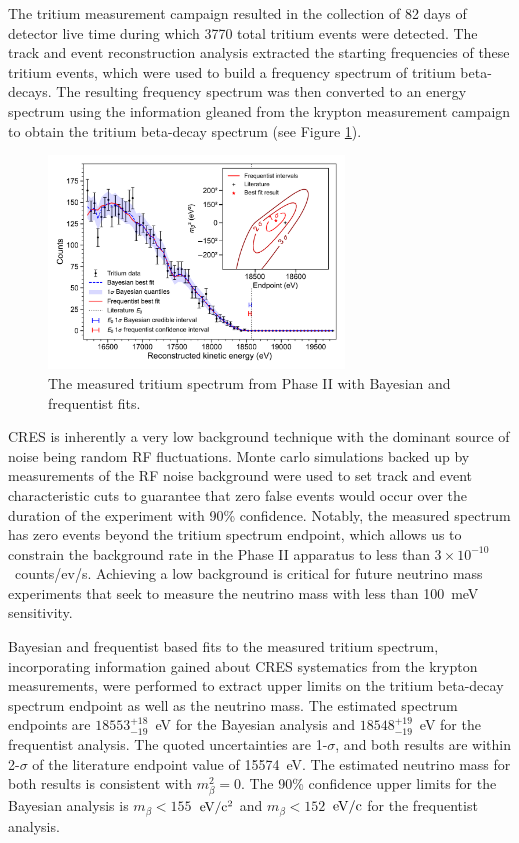 The tritium measurement campaign resulted in the collection of 82 days of detector live time during which 3770 total tritium events were detected. The track and event reconstruction analysis extracted the starting frequencies of these tritium events, which were used to build a frequency spectrum of tritium beta-decays. The resulting frequency spectrum was then converted to an energy spectrum using the information gleaned from the krypton measurement campaign to obtain the tritium beta-decay spectrum (see Figure \ref{fig:chap3-final-tritium-fit}).
\begin{figure}
    \centering
    \includegraphics[width=0.7\textwidth]{figs/Chapter-3/12-03-22A_final_E0_real_data_phase_II_tritium_fit_1d.pdf}
    \caption{The measured tritium spectrum from Phase II with Bayesian and frequentist fits.}
    \label{fig:chap3-final-tritium-fit}
\end{figure}

CRES is inherently a very low background technique with the dominant source of noise being random RF fluctuations. Monte carlo simulations backed up by measurements of the RF noise background were used to set track and event characteristic cuts to guarantee that zero false events would occur over the duration of the experiment with 90\% confidence. Notably, the measured spectrum has zero events beyond the tritium spectrum endpoint, which allows us to constrain the background rate in the Phase II apparatus to less than $3\times10^{-10}$~counts/ev/s. Achieving a low background is critical for future neutrino mass experiments that seek to measure the neutrino mass with less than 100~meV sensitivity.

Bayesian and frequentist based fits to the measured tritium spectrum, incorporating information gained about CRES systematics from the krypton measurements, were performed to extract upper limits on the tritium beta-decay spectrum endpoint as well as the neutrino mass. The estimated spectrum endpoints are $18553^{+18}_{-19}$~eV for the Bayesian analysis and $18548^{+19}_{-19}$~eV for the frequentist analysis. The quoted uncertainties are 1-$\sigma$, and both results are within 2-$\sigma$ of the literature endpoint value of 15574~eV. The estimated neutrino mass for both results is consistent with $m_\beta^2=0$. The 90\% confidence upper limits for the Bayesian analysis is $m_\beta < 155$~$\rm{eV}/\rm{c}^2$ and $m_\beta < 152$~$\rm{eV}/\rm{c}$ for the frequentist analysis.

